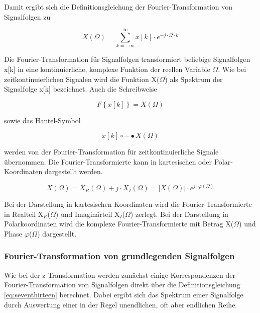\noindent Damit ergibt sich die Definitionsgleichung der Fourier-Transformation von Signalfolgen zu

\begin{equation}\label{eq:seventhirteen}
X\left(\Omega \right)=\sum _{k=-\infty }^{\infty }x\left[k\right]\cdot e^{-j\cdot \Omega \cdot k}
\end{equation}

\noindent Die Fourier-Transformation f\"{u}r Signalfolgen transformiert beliebige Signalfolgen x[k] in eine kontinuierliche, komplexe Funktion der reellen Variable $\Omega$. Wie bei zeitkontinuierlichen Signalen wird die Funktion X($\Omega$) als Spektrum der Signalfolge x[k] bezeichnet. Auch die Schreibweise

\begin{equation}\label{eq:sevenfourteen}
F\left\{x\left[k\right]\right\}=X\left(\Omega \right)
\end{equation}

\noindent sowie das Hantel-Symbol 

\begin{equation}\label{eq:sevenfifteen}
x\left[k\right]\circ -\bullet X\left(\Omega \right)
\end{equation}

\noindent werden von der Fourier-Transformation f\"{u}r zeitkontinuierliche Signale \"{u}bernommen. Die Fourier-Transformierte kann in kartesischen oder Polar-Koordinaten dargestellt werden. 

\begin{equation}\label{eq:sevensixteen}
X\left(\Omega \right)=X_{R} \left(\Omega \right)+j\cdot X_{I} \left(\Omega \right)=\left|X\left(\Omega \right)\right|\cdot e^{j\cdot \varphi \left(\Omega \right)}
\end{equation}

\noindent Bei der Darstellung in kartesischen Koordinaten wird die Fourier-Transformierte in Realteil X${}_{R}$($\Omega$) und Imagin\"{a}rteil X${}_{I}$($\Omega$) zerlegt. Bei der Darstellung in Polarkoordinaten wird die komplexe Fourier-Transformierte mit Betrag {\textbar}X($\Omega$){\textbar} und Phase $\varphi$($\Omega$) dargestellt.

\subsubsection{Fourier-Transformation von grundlegenden Signalfolgen}

\noindent Wie bei der z-Transformation werden zun\"{a}chst einige Korrespondenzen der Fourier-Transformation von Signalfolgen direkt \"{u}ber die Definitionsgleichung \eqref{eq:seventhirteen} berechnet. Dabei ergibt sich das Spektrum einer Signalfolge durch Auswertung einer in der Regel unendlichen, oft aber endlichen Reihe.

